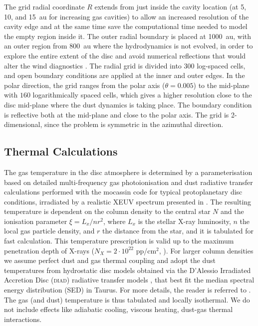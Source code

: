 \documentclass[fleqn,usenatbib]{mnras}
\begin{document}
        The grid radial coordinate $R$ extends from just inside the cavity location (at 5, 10, and \SI{15}{au} for increasing gas cavities) to allow an increased resolution of the cavity edge and at the same time save the computational time needed to model the empty region inside it. The outer radial boundary is placed at \SI{1000}{au}, with an outer region from \SI{800}{au} where the hydrodynamics is not evolved, in order to explore the entire extent of the disc and avoid numerical reflections that would alter the wind diagnostics \citep{Picogna2019}. The radial grid is divided into 300 log-spaced cells, and open boundary conditions are applied at the inner and outer edges.
        In the polar direction, the grid ranges from the polar axis ($\theta = 0.005$) to the mid-plane with $160$ logarithmically spaced cells, which gives a higher resolution close to the disc mid-plane where the dust dynamics is taking place. The boundary condition is reflective both at the mid-plane and close to the polar axis. The grid is 2-dimensional, since the problem is symmetric in the azimuthal direction.
        
    \subsection{Thermal Calculations}\label{sec:mocassin}

        The gas temperature in the disc atmosphere is determined by a parameterisation based on detailed multi-frequency gas photoionisation and dust radiative transfer calculations performed with the {\sc mocassin} code \citep{MOCASSIN1,MOCASSIN2,MOCASSIN3} for typical protoplanetary disc conditions, irradiated by a realistic XEUV spectrum presented in \citet{Ercolano2008,Ercolano2009}.
        The resulting temperature is dependent on the column density to the central star $N$ and the ionisation parameter $\xi=L_x/nr^2$, where $L_x$ is the stellar X-ray luminosity, $n$ the local gas particle density, and $r$ the distance from the star, and it is tabulated for fast calculation.
        This temperature prescription is valid up to the maximum penetration depth of X-rays ($N_X = 2\cdot10^{22}$ pp/cm$^2$, \cite{Ercolano2009}).
        For larger column densities we assume perfect dust and gas thermal coupling and adopt the dust temperatures from hydrostatic disc models obtained via the D’Alessio Irradiated Accretion Disc (\textsc{diad}) radiative transfer models \citep{DAlessio1998,DAlessio1999,DAlessio2001,DAlessio2005,DAlessio2006}, that best fit the median spectral energy distribution (SED) in Taurus. For more details, the reader is referred to \citet{Picogna2019}.
        The gas (and dust) temperature is thus tabulated and locally isothermal. We do not include effects like adiabatic cooling, viscous heating, dust-gas thermal interactions.
       
\end{document}
